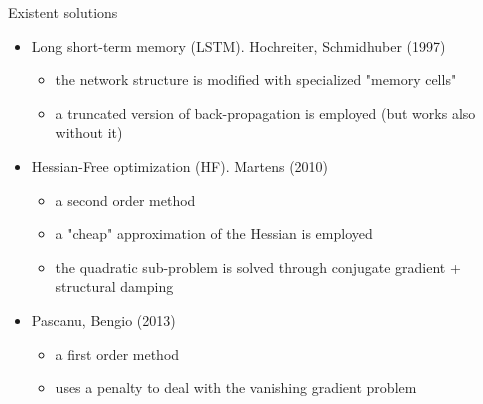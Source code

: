 \begin{frame}{Existent solutions}
	
	\begin{itemize}
		\item Long short-term memory (LSTM). Hochreiter, Schmidhuber (1997)\cite{lstm}
			\begin{itemize}
				\item the network structure is modified with specialized "memory cells"
				\item a truncated version of back-propagation is employed (but works also without it)
			\end{itemize}
		\pause
		\item Hessian-Free optimization (HF). Martens (2010) \cite{hessianFree}
		\begin{itemize}
			\item a second order method
			\item a "cheap" approximation of the Hessian is employed
			\item the quadratic sub-problem is solved through conjugate gradient + structural damping
		\end{itemize}
		\pause
		\item Pascanu, Bengio (2013) \cite{pascanu}
		\begin{itemize}
			\item a first order method
			\item uses a penalty to deal with the vanishing gradient problem
		\end{itemize}
	\end{itemize}
	
\end{frame}
